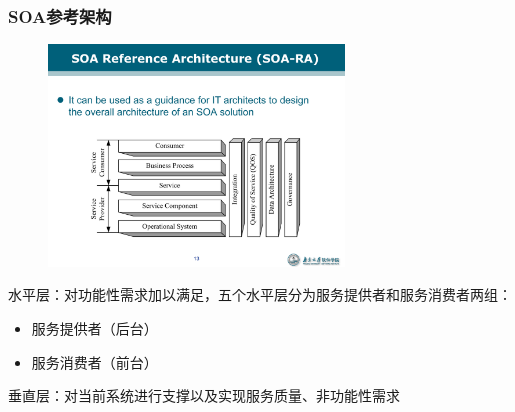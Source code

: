 \subsubsection*{SOA参考架构}
\begin{figure}[H]
    \vspace{-0.5em}
	\centering
	\includegraphics[width=0.7\textwidth]{SOA参考架构.pdf}
    \vspace{-1em}
\end{figure}

水平层：对功能性需求加以满足，五个水平层分为服务提供者和服务消费者两组：
\begin{itemize}
    \item 服务提供者（后台）
\end{itemize}
\begin{spacing}{1.2}
    
    \vspace{-2.5em}
\end{spacing}

\begin{itemize}
    \item 服务消费者（前台）
\end{itemize}

\begin{spacing}{1.15}
    
    \vspace{-1em}
\end{spacing}

垂直层：对当前系统进行支撑以及实现服务质量、非功能性需求
\begin{spacing}{1.15}
    
    \vspace{-2em}
\end{spacing}

